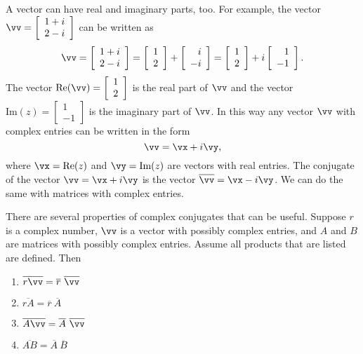 \label{sec:complex_vect}

A vector can have real and imaginary parts, too. For example, the vector $\vv = \left[ \begin{array}{c} 1+i \\ 2-i \end{array} \right]$ can be written as 
\[\vv = \left[ \begin{array}{c} 1+i \\ 2-i \end{array} \right] = \left[ \begin{array}{c} 1 \\ 2 \end{array} \right] + \left[ \begin{array}{r} i \\ -i \end{array} \right] = \left[ \begin{array}{c} 1 \\ 2 \end{array} \right] + i\left[ \begin{array}{r} 1 \\ -1 \end{array} \right].\]
The vector $\text{Re}(\vv) = \left[ \begin{array}{c} 1 \\ 2 \end{array} \right]$ is the real part of $\vv$ and the vector $\text{Im}(z) = \left[ \begin{array}{r} 1 \\ -1 \end{array} \right]$ is the imaginary part of $\vv$. In this way any vector $\vv$ with complex entries can be written in the form 
\[\vv = \vx + i \vy,\]
where $\vx = \text{Re}(z)$ and $\vy = \text{Im}(z)$ are vectors with real entries. The conjugate of the vector $\vv = \vx + i \vy$ is the vector $\overline{\vv} = \vx - i \vy$. We can do the same with matrices with complex entries. 

There are several properties of complex conjugates that can be useful. Suppose $r$ is a complex number, $\vv$ is a vector with possibly complex entries, and $A$ and $B$ are matrices with possibly complex entries. Assume all products that are listed are defined. Then
\begin{enumerate}
\item $\overline{r\vv} = \overline{r} \ \overline{\vv}$ 
\item $\overline{rA} = \overline{r} \ \overline{A}$
\item $\overline{A\vv} = \overline{A} \ \overline{\vv}$ 
\item $\overline{AB} = \overline{A} \ \overline{B}$ 
\end{enumerate}


